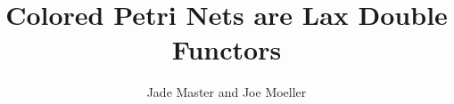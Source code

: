 \title[Colored Petri Nets are Functors]{Colored Petri Nets are Lax Double Functors}

\author[Master and Moeller]{Jade Master and Joe Moeller}


